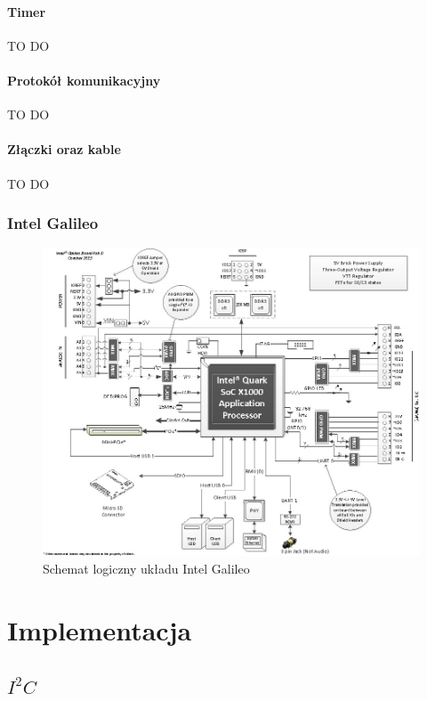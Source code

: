\documentclass{xmgr}
\begin{document}
\subsubsection{Timer}
TO DO
\subsubsection{Protokół komunikacyjny}
TO DO
\subsubsection{Złączki oraz kable}
TO DO
\subsection{Intel Galileo}

\begin{figure}[!htb]
    \centering
    \includegraphics[height=0.3\textheight]{images/IntelGalileoLogicSchematics.jpg}
    \caption{Schemat logiczny układu Intel Galileo\label{IntelGalileoLogicSchematics}}
\end{figure}


\chapter{Implementacja}
\section{$I^2C$}
\end{document}

